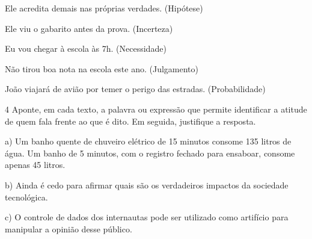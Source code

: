 \begin{escolha}
\item Ele acredita demais nas próprias verdades. (Hipótese)


\item Ele viu o gabarito antes da prova. (Incerteza)


\item Eu vou chegar à escola às 7h. (Necessidade)


\item Não tirou boa nota na escola este ano. (Julgamento)


\item João viajará de avião por temer o perigo das estradas.
(Probabilidade)

\end{escolha}

\num{4} Aponte, em cada texto, a palavra ou expressão que permite
identificar a atitude de quem fala frente ao que é dito. Em seguida,
justifique a resposta.

a) Um banho quente de chuveiro elétrico de 15 minutos consome 135 litros
de água. Um banho de 5 minutos, com o registro fechado para ensaboar,
consome apenas 45 litros.


b) Ainda é cedo para afirmar quais são os verdadeiros impactos da
sociedade tecnológica.


c) O controle de dados dos internautas pode ser utilizado como artifício
para manipular a opinião desse público.

